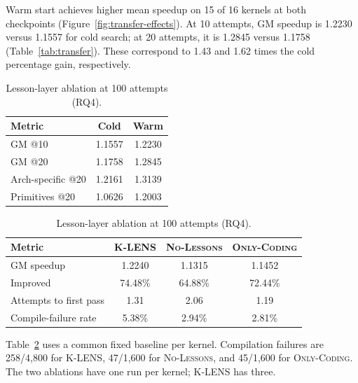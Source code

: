 \documentclass[acmsmall,screen,review,anonymous,nonacm]{acmart}
\newcommand{\klens}{\textsc{K-LENS}\xspace}
\newcommand{\nolessons}{\textsc{No-Lessons}\xspace}
\newcommand{\onlycodinglessons}{\textsc{Only-Coding}\xspace}
\newcommand{\numprofiles}{100\xspace}
\begin{document}
Warm start achieves higher mean speedup on 15 of 16 kernels at both
checkpoints (Figure~\ref{fig:transfer-effects}). At 10 attempts,
GM speedup is 1.2230 versus 1.1557 for cold search; at 20 attempts,
it is 1.2845 versus 1.1758 (Table~\ref{tab:transfer}). These correspond
to 1.43 and 1.62 times the cold percentage gain, respectively.

\begin{table}[t]
  \centering
  \footnotesize
  \setlength{\tabcolsep}{3pt}
  \begin{minipage}[t]{0.36\textwidth}
  \centering
  \caption{Warm-start GM speedup.}
  \label{tab:transfer}
  \begin{tabular}{@{}lcc@{}}
    \toprule
    Metric & Cold & Warm \\
    \midrule
    GM @10 & 1.1557 & 1.2230 \\
    GM @20 & 1.1758 & 1.2845 \\
    Arch-specific @20 & 1.2161 & 1.3139 \\
    Primitives @20 & 1.0626 & 1.2003 \\
    \bottomrule
  \end{tabular}
  \end{minipage}\hfill
  \begin{minipage}[t]{0.62\textwidth}
  \centering
  \caption{Lesson-layer ablation at \numprofiles attempts (RQ4).}
  \label{tab:ablation}
  \begin{tabular}{@{}lccc@{}}
    \toprule
    Metric & \klens & \nolessons & \onlycodinglessons \\
    \midrule
    GM speedup & 1.2240 & 1.1315 & 1.1452 \\
    Improved & 74.48\% & 64.88\% & 72.44\% \\
    Attempts to first pass & 1.31 & 2.06 & 1.19 \\
    Compile-failure rate & 5.38\% & 2.94\% & 2.81\% \\
    \bottomrule
  \end{tabular}
  \end{minipage}
  \par\smallskip
  \begin{minipage}{\textwidth}\footnotesize
  Table~\ref{tab:ablation} uses a common fixed baseline per kernel.
  Compilation failures are 258/4,800 for \klens, 47/1,600 for
  \nolessons, and 45/1,600 for \onlycodinglessons. The two ablations
  have one run per kernel; \klens has three.
  \end{minipage}
\end{table}
\end{document}
